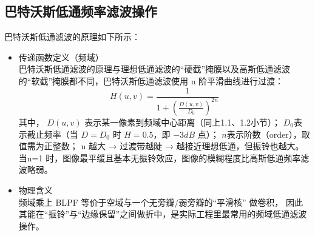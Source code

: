 \documentclass[11pt]{article}
\begin{document}
       \subsection{巴特沃斯低通频率滤波操作} 
    巴特沃斯低通滤波的原理如下所示：
    \begin{itemize}
    	\item 传递函数定义（频域）\\
    	巴特沃斯低通滤波的原理与理想低通滤波的“硬截”掩膜以及高斯低通滤波的“软截”掩膜都不同，巴特沃斯低通滤波使用 n 阶平滑曲线进行过渡：
    	$$H(u,v) = \frac{1}{1 + (\frac{D(u,v)}{D_0})^{2n}}$$
    	其中，
    	$D(u,v)$ 表示某一像素到频域中心距离（同上1.1、1.2小节）；
    	$D_0$表示截止频率（当 $D=D_0$ 时 $H=0.5$，即 $−3 dB$ 点）；
    	$n$表示阶数（order），取值需为正整数；
    	n 越大 → 过渡带越陡 → 越接近理想低通，但振铃也越大。\\
    	当n=1 时，图像最平缓且基本无振铃效应，图像的模糊程度比高斯低通频率滤波略弱。
    	\item 物理含义\\
    	频域乘上 BLPF 等价于空域与一个无旁瓣/弱旁瓣的“平滑核” 做卷积，
    	因此其能在“振铃”与“边缘保留”之间做折中，是实际工程里最常用的频域低通滤波操作。
    \end{itemize}
\end{document}
